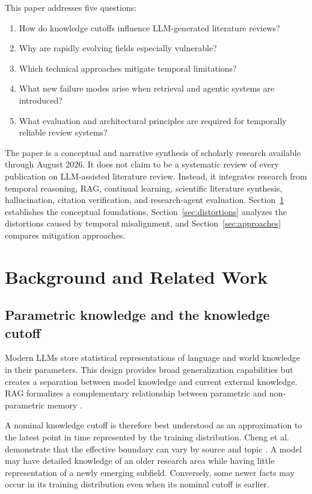 \documentclass[manuscript,screen]{acmart}
\begin{document}
This paper addresses five questions:
\begin{enumerate}[leftmargin=*]
    \item How do knowledge cutoffs influence LLM-generated literature reviews?
    \item Why are rapidly evolving fields especially vulnerable?
    \item Which technical approaches mitigate temporal limitations?
    \item What new failure modes arise when retrieval and agentic systems are introduced?
    \item What evaluation and architectural principles are required for temporally reliable review systems?
\end{enumerate}

The paper is a conceptual and narrative synthesis of scholarly research available through August 2026. It
does not claim to be a systematic review of every publication on LLM-assisted literature review. Instead,
it integrates research from temporal reasoning, RAG, continual learning, scientific literature synthesis,
hallucination, citation verification, and research-agent evaluation. Section~\ref{sec:background} establishes
the conceptual foundations, Section~\ref{sec:distortions} analyzes the distortions caused by temporal
misalignment, and Section~\ref{sec:approaches} compares mitigation approaches.

\section{Background and Related Work}\label{sec:background}

\subsection{Parametric knowledge and the knowledge cutoff}\label{subsec:parametric}
Modern LLMs store statistical representations of language and world knowledge in their parameters. This
design provides broad generalization capabilities but creates a separation between model knowledge and
current external knowledge. RAG formalizes a complementary relationship between parametric and
non-parametric memory \cite{lewis2020}.

A nominal knowledge cutoff is therefore best understood as an approximation to the latest point in time
represented by the training distribution. Cheng et al. demonstrate that the effective boundary can vary by
source and topic \cite{cheng2024}. A model may have detailed knowledge of an older research area while
having little representation of a newly emerging subfield. Conversely, some newer facts may occur in its
training distribution even when its nominal cutoff is earlier.
\end{document}
